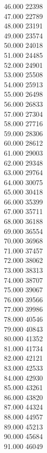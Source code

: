 { 46.000	22398 \\
 47.000	22789 \\
 48.000	23191 \\
 49.000	23574 \\
 50.000	24018 \\
 51.000	24485 \\
 52.000	24901 \\
 53.000	25508 \\
 54.000	25913 \\
 55.000	26498 \\
 56.000	26833 \\
 57.000	27304 \\
 58.000	27716 \\
 59.000	28306 \\
 60.000	28612 \\
 61.000	29003 \\
 62.000	29348 \\
 63.000	29764 \\
 64.000	30075 \\
 65.000	30418 \\
 66.000	35399 \\
 67.000	35711 \\
 68.000	36188 \\
 69.000	36554 \\
 70.000	36968 \\
 71.000	37457 \\
 72.000	38062 \\
 73.000	38313 \\
 74.000	38707 \\
 75.000	39067 \\
 76.000	39566 \\
 77.000	39986 \\
 78.000	40546 \\
 79.000	40843 \\
 80.000	41352 \\
 81.000	41734 \\
 82.000	42121 \\
 83.000	42533 \\
 84.000	42930 \\
 85.000	43261 \\
 86.000	43820 \\
 87.000	44324 \\
 88.000	44957 \\
 89.000	45213 \\
 90.000	45684 \\
 91.000	46049 \\
}
